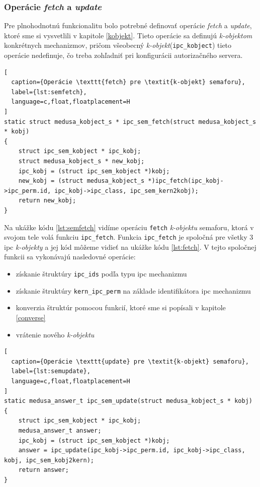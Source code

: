 \subsubsection{Operácie \textit{fetch} a \textit{update}} \label{ops}
Pre plnohodnotnú funkcionalitu bolo potrebné definovať operácie \textit{fetch} a \textit{update}, ktoré sme si vysvetlili v kapitole \ref{kobjekt}. Tieto operácie sa definujú \textit{k-objektom} konkrétnych mechanizmov, pričom všeobecný \textit{k-objekt}(\texttt{ipc\_kobject}) tieto operácie nedefinuje, čo treba zohľadniť pri konfigurácii autorizačného servera. 
\begin{lstlisting}[
  caption={Operácie \texttt{fetch} pre \textit{k-objekt} semaforu},
  label={lst:semfetch},
  language=c,float,floatplacement=H
]
static struct medusa_kobject_s * ipc_sem_fetch(struct medusa_kobject_s * kobj)
{
	struct ipc_sem_kobject * ipc_kobj;
	struct medusa_kobject_s * new_kobj;
	ipc_kobj = (struct ipc_sem_kobject *)kobj;
	new_kobj = (struct medusa_kobject_s *)ipc_fetch(ipc_kobj->ipc_perm.id, ipc_kobj->ipc_class, ipc_sem_kern2kobj);
	return new_kobj;
}
\end{lstlisting}
Na ukážke kódu \ref{lst:semfetch} vidíme operáciu \texttt{fetch} \textit{k-objektu} semaforu, ktorá v svojom tele volá funkciu \texttt{ipc\_fetch}. Funkcia \texttt{ipc\_fetch} je spoločná pre všetky 3 \acrshort{ipc} \textit{k-objekty} a jej kód môžeme vidieť na ukážke kódu \ref{lst:fetch}. V tejto spoločnej funkcii sa vykonávajú nasledovné operácie:
\begin{itemize}
\item získanie štruktúry \texttt{ipc\_ids} podľa typu \acrshort{ipc} mechanizmu
\item získanie štruktúry \texttt{kern\_ipc\_perm} na základe identifikátora \acrshort{ipc} mechanizmu
\item konverzia štruktúr pomocou funkcií, ktoré sme si popísali v kapitole \ref{converse}
\item vrátenie nového \textit{k-objektu}
\end{itemize}
\begin{lstlisting}[
  caption={Operácie \texttt{update} pre \textit{k-objekt} semaforu},
  label={lst:semupdate},
  language=c,float,floatplacement=H
]
static medusa_answer_t ipc_sem_update(struct medusa_kobject_s * kobj)
{
	struct ipc_sem_kobject * ipc_kobj;
	medusa_answer_t answer;
	ipc_kobj = (struct ipc_sem_kobject *)kobj;
	answer = ipc_update(ipc_kobj->ipc_perm.id, ipc_kobj->ipc_class, kobj, ipc_sem_kobj2kern);
	return answer;
}
\end{lstlisting}
